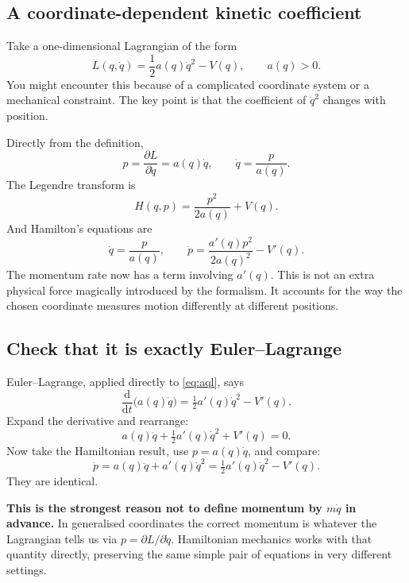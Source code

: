 \documentclass[11pt,a4paper,oneside]{article}
\newcommand{\pd}[2]{\frac{\partial #1}{\partial #2}}
\newcommand{\dt}[1]{\frac{\mathrm d #1}{\mathrm d t}}
\begin{document}
\subsection{A coordinate-dependent kinetic coefficient}
Take a one-dimensional Lagrangian of the form
\begin{equation}\label{eq:aql}
 L(q,\dot q)=\frac12a(q)\dot q^2-V(q),\qquad a(q)>0.
\end{equation}
You might encounter this because of a complicated coordinate system or a mechanical constraint. The key point is that the coefficient of $\dot q^2$ changes with position.

Directly from the definition,
\[
 p=\pd{L}{\dot q}=a(q)\dot q,
\qquad\dot q=\frac{p}{a(q)}.
\]
The Legendre transform is
\[
 \boxed{H(q,p)=\frac{p^2}{2a(q)}+V(q).}
\]
And Hamilton's equations are
\begin{equation}\label{eq:aqham}
 \boxed{\dot q=\frac{p}{a(q)},\qquad
 \dot p=\frac{a'(q)p^2}{2a(q)^2}-V'(q).}
\end{equation}
The momentum rate now has a term involving $a'(q)$. This is not an extra physical force magically introduced by the formalism. It accounts for the way the chosen coordinate measures motion differently at different positions.

\subsection{Check that it is exactly Euler--Lagrange}
Euler--Lagrange, applied directly to \eqref{eq:aql}, says
\[
 \dt{}\bigl(a(q)\dot q\bigr)=\tfrac12a'(q)\dot q^2-V'(q).
\]
Expand the derivative and rearrange:
\[
 a(q)\ddot q+\tfrac12a'(q)\dot q^2+V'(q)=0.
\]
Now take the Hamiltonian result, use $p=a(q)\dot q$, and compare:
\[
 \dot p=a(q)\ddot q+a'(q)\dot q^2
       =\tfrac12a'(q)\dot q^2-V'(q).
\]
They are identical.

\begin{intuition}
\textbf{This is the strongest reason not to define momentum by $m\dot q$ in advance.} In generalised coordinates the correct momentum is whatever the Lagrangian tells us via $p=\partial L/\partial\dot q$. Hamiltonian mechanics works with that quantity directly, preserving the same simple pair of equations in very different settings.
\end{intuition}
\end{document}
